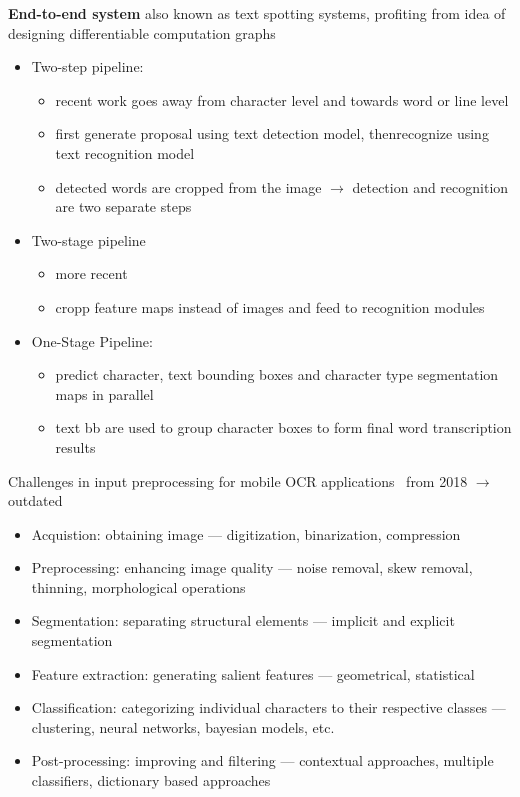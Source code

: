 \textbf{End-to-end system}
also known as text spotting systems, profiting from idea of designing differentiable computation
graphs
\begin{itemize}
    \item Two-step pipeline:
        \begin{itemize}
            \item recent work goes away from character level and towards word or line level
            \item first generate proposal using text detection model, thenrecognize using
                text recognition model
            \item detected words are cropped from the image $\rightarrow$ detection and recognition
                are two separate steps
        \end{itemize}
    \item Two-stage pipeline
        \begin{itemize}
            \item more recent
            \item cropp feature maps instead of images and feed to recognition modules
        \end{itemize}
    \item One-Stage Pipeline:
        \begin{itemize}
            \item predict character, text bounding boxes and character type segmentation
                maps in parallel
            \item text bb are used to group character boxes to form final word transcription results
        \end{itemize}
\end{itemize}

Challenges in input preprocessing for mobile OCR applications~\cite{sourvanos_challenges_2018}
from 2018 $\rightarrow$ outdated
\begin{itemize}
    \item Acquistion: obtaining image --- digitization, binarization, compression
    \item Preprocessing: enhancing image quality --- noise removal, skew removal, thinning,
        morphological operations
    \item Segmentation: separating structural elements --- implicit and explicit segmentation
    \item Feature extraction: generating salient features --- geometrical, statistical
    \item Classification: categorizing individual characters to their respective classes
        --- clustering, neural networks, bayesian models, etc.
    \item Post-processing: improving and filtering --- contextual approaches, multiple classifiers,
        dictionary based approaches
\end{itemize}

